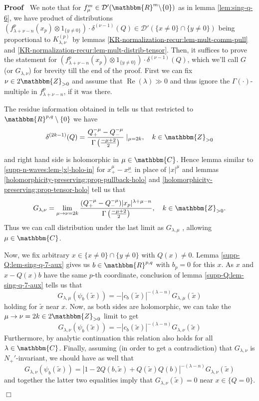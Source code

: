 \documentclass{article}
\newcommand{\tmop}[1]{\ensuremath{\operatorname{#1}}}
\renewenvironment{proof}{\noindent\textbf{Proof\ }}{\hspace*{\fill}$\Box$\medskip}
\theoremstyle{remark}
\newcommand{\Z}{\mathbbm{Z}}
\newcommand{\R}{\mathbbm{R}}
\begin{document}
\begin{proof}
  We note that for $f_{\mu}^m \in \mathcal{D}' (\mathbbm{R}^m \backslash \{ 0
  \})$ as in lemma \ref{lem:sing-q-6}, we have product of distributions
  $(f_{\lambda + \nu - n}^p (x_p) \otimes 1_{\{ y \neq 0 \}}) \cdot
  \delta^{(\nu - 1)} (Q) \in \mathcal{D}' (\{ x \neq 0 \} \cap \{ y \neq 0
  \})$ being proportional to $K_{\lambda, \nu}^{(p)}$ by lemmas
  \ref{KR-normalization-recur:lem-mult-comm-pull} and
  \ref{KR-normalization-recur:lem-mult-distrib-tensor}. Then, it suffices to
  prove the statement for $(f_{\lambda + \nu - n}^p (x_p) \otimes 1_{\{ y \neq
  0 \}}) \cdot \delta^{(\nu - 1)} (Q)$, which we'll call $G$ (or $G_{\lambda,
  \nu}$) for brevity till the end of the proof. First we can fix $\nu \in
  2\mathbbm{Z}_{> 0}$ and assume that $\tmop{Re} (\lambda) \gg 0$ and thus
  ignore the $\Gamma (\cdot)$-multiple in $f_{\lambda + \nu - n}^p$, if it was
  there.
  
  The residue information obtained in {\cite[ch. III, sec
  2.2]{gelfand1980distribution}} tells us that restricted to $\R^{p, q}
  \setminus \{ 0 \}$ we have
  \[ \delta^{(2 k - 1)} (Q) = \frac{Q_+^{- \mu} - Q_-^{- \mu}}{\Gamma \left(
     \frac{- \mu + 2}{2} \right)} \mid_{\mu = 2 k}, \quad k \in \Z_{> 0}
  \]
  
  
  and right hand side is holomorphic in $\mu \in \mathbbm{C}$. Hence lemma
  similar to \ref{supp-n-waves:lem-|x|-holo-in} for $x_+^{\mu} - x_-^{\mu}$ in
  place of $| x |^{\mu}$ and lemmas
  \ref{holomorphicity-preserving:prop-pullback-holo} and
  \ref{holomorphicity-preserving:prop-tensor-holo} tell us that
  \[ G_{\lambda, \nu} = \lim_{\mu \to \nu = 2 k}  \frac{(Q_+^{- \mu} -
     Q_-^{- \mu}) | x_p |^{\lambda + \mu - n}}{\Gamma \left( \frac{- \mu +
     2}{2} \right)}, \quad k \in \Z_{> 0} . \]
  Thus we can call distribution under the last limit as $G_{\lambda, \mu}$ ,
  allowing $\mu \in \mathbbm{C}$.
  
  Now, we fix arbitrary $x \in \{ x \neq 0 \} \cap \{ y \neq 0 \}$ with $Q (x)
  \neq 0$. Lemma \ref{supp-Q:lem-sing-q-7-aux} gives us $b \in \mathbbm{R}^{p,
  q}$ with $b_p = 0$ for this $x$. As $x$ and $x - Q (x) b$ have the same
  $p$-th coordinate, conclusion of lemma \ref{supp-Q:lem-sing-q-7-aux} tells
  us that
  \[ G_{\lambda, \mu} (\psi_b (\tilde{x})) = - | c_b (\tilde{x}) |^{- (\lambda
     - n)} G_{\lambda, \mu} (\tilde{x}) \]
  holding for $\tilde{x}$ near $x$. Now, as both sides are holomorphic, we can
  take the $\mu \rightarrow \nu = 2 k \in 2\mathbbm{Z}_{> 0}$ limit to get
  \[ G_{\lambda, \nu} (\psi_b (\tilde{x})) = - | c_b (\tilde{x}) |^{- (\lambda
     - n)} G_{\lambda, \nu} (\tilde{x}) \]
  Furthermore, by analytic continuation this relation also holds for all
  $\lambda \in \mathbbm{C}$. Finally, assuming (in order to get a
  contradiction) that $G_{\lambda, \nu}$ is $N_+'$-invariant, we should have
  as well that
  \[ G_{\lambda, \nu} (\psi_b (\tilde{x})) = | 1 - 2 Q (b, \tilde{x}) + Q
     (\tilde{x}) Q (b) |^{- (\lambda - n)} G_{\lambda, \nu} (\tilde{x}) \]
  and together the latter two equalities imply that $G_{\lambda, \nu}
  (\tilde{x}) = 0$ near $x \in \{ Q = 0 \}$.
  

\end{proof}
\end{document}
